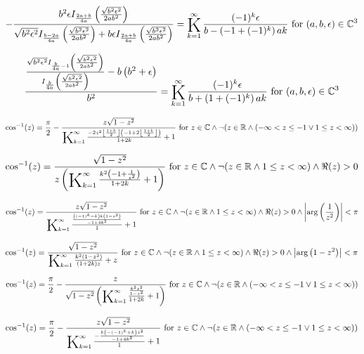 \documentclass{article}
\newcommand{\bigK}{\mathop{\raisebox{-5pt}{\huge K}}}
\begin{document}
\[-\frac{b^2 \epsilon  I_{\frac{2 a+b}{4 a}}\left(\frac{\sqrt{b^2 \epsilon ^2}}{2 a b^2}\right)}{\sqrt{b^2 \epsilon ^2} I_{\frac{b-2 a}{4 a}}\left(\frac{\sqrt{b^2 \epsilon ^2}}{2 a b^2}\right)+b \epsilon  I_{\frac{2 a+b}{4 a}}\left(\frac{\sqrt{b^2 \epsilon ^2}}{2 a b^2}\right)}=\bigK_{k=1}^{\infty}\frac{(-1)^k \epsilon }{b-\left(-1+(-1)^k\right) a k}\text{ for }(a,b,\epsilon )\in \mathbb{C}^3\] 

\[\frac{\frac{\sqrt{b^2 \epsilon ^2} I_{\frac{b}{4 a}-1}\left(\frac{\sqrt{b^2 \epsilon ^2}}{2 a b^2}\right)}{I_{\frac{b}{4 a}}\left(\frac{\sqrt{b^2 \epsilon ^2}}{2 a b^2}\right)}-b \left(b^2+\epsilon \right)}{b^2}=\bigK_{k=1}^{\infty}\frac{(-1)^k \epsilon }{b+\left(1+(-1)^k\right) a k}\text{ for }(a,b,\epsilon )\in \mathbb{C}^3\] 

\[\cos ^{-1}(z)=\frac{\pi }{2}-\frac{z \sqrt{1-z^2}}{\bigK_{k=1}^{\infty}\frac{-2 z^2 \left\lfloor \frac{1+k}{2}\right\rfloor  \left(-1+2 \left\lfloor \frac{1+k}{2}\right\rfloor \right)}{1+2 k}+1}\text{ for }z\in \mathbb{C}\land \neg (z\in \mathbb{R}\land (-\infty <z\leq -1\lor 1\leq z<\infty ))\] 

\[\cos ^{-1}(z)=\frac{\sqrt{1-z^2}}{z \left(\bigK_{k=1}^{\infty}\frac{k^2 \left(-1+\frac{1}{z^2}\right)}{1+2 k}+1\right)}\text{ for }z\in \mathbb{C}\land \neg (z\in \mathbb{R}\land 1\leq z<\infty )\land \Re(z)>0\] 

\[\cos ^{-1}(z)=\frac{z \sqrt{1-z^2}}{\bigK_{k=1}^{\infty}\frac{\frac{\left((-1)^k-k\right) k \left(1-z^2\right)}{-1+4 k^2}}{1}+1}\text{ for }z\in \mathbb{C}\land \neg (z\in \mathbb{R}\land 1\leq z<\infty )\land \Re(z)>0\land \left| \arg \left(\frac{1}{z^2}\right)\right| <\pi\] 

\[\cos ^{-1}(z)=\frac{\sqrt{1-z^2}}{\bigK_{k=1}^{\infty}\frac{k^2 \left(1-z^2\right)}{(1+2 k) z}+z}\text{ for }z\in \mathbb{C}\land \neg (z\in \mathbb{R}\land 1\leq z<\infty )\land \Re(z)>0\land \left| \arg \left(1-z^2\right)\right| <\pi\] 

\[\cos ^{-1}(z)=\frac{\pi }{2}-\frac{z}{\sqrt{1-z^2} \left(\bigK_{k=1}^{\infty}\frac{\frac{k^2 z^2}{1-z^2}}{1+2 k}+1\right)}\text{ for }z\in \mathbb{C}\land \neg (z\in \mathbb{R}\land (-\infty <z\leq -1\lor 1\leq z<\infty ))\] 

\[\cos ^{-1}(z)=\frac{\pi }{2}-\frac{z \sqrt{1-z^2}}{\bigK_{k=1}^{\infty}\frac{-\frac{k \left(-(-1)^k+k\right) z^2}{-1+4 k^2}}{1}+1}\text{ for }z\in \mathbb{C}\land \neg (z\in \mathbb{R}\land (-\infty <z\leq -1\lor 1\leq z<\infty ))\] 
\end{document}
